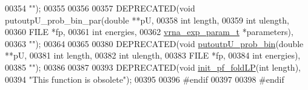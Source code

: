 \begin{DoxyCode}
00354 \textcolor{stringliteral}{""});
00355 
00356 
00357 DEPRECATED(\textcolor{keywordtype}{void} putoutpU\_prob\_bin\_par(\textcolor{keywordtype}{double}            **pU,
00358                                       \textcolor{keywordtype}{int}               length,
00359                                       \textcolor{keywordtype}{int}               ulength,
00360                                       FILE              *fp,
00361                                       \textcolor{keywordtype}{int}               energies,
00362                                       \hyperlink{group__energy__parameters_structvrna__exp__param__s}{vrna\_exp\_param\_t}  *parameters),
00363 \textcolor{stringliteral}{""});
00364 
00365 
00380 DEPRECATED(\textcolor{keywordtype}{void}    \hyperlink{group__local__pf__fold_ga9acb00ee10e96b1ca4ea394cd8bcec75}{putoutpU\_prob\_bin}(\textcolor{keywordtype}{double} **pU,
00381                                      \textcolor{keywordtype}{int}    length,
00382                                      \textcolor{keywordtype}{int}    ulength,
00383                                      FILE   *fp,
00384                                      \textcolor{keywordtype}{int}    energies),
00385 \textcolor{stringliteral}{""});
00386 
00387 
00393 DEPRECATED(\textcolor{keywordtype}{void} \hyperlink{LPfold_8h_ae85bf55053e9fb295208be322e0fa07a}{init\_pf\_foldLP}(\textcolor{keywordtype}{int} length),
00394 \textcolor{stringliteral}{"This function is obsolete"});
00395 
00396 \textcolor{preprocessor}{#endif}
00397 
00398 \textcolor{preprocessor}{#endif}
\end{DoxyCode}
